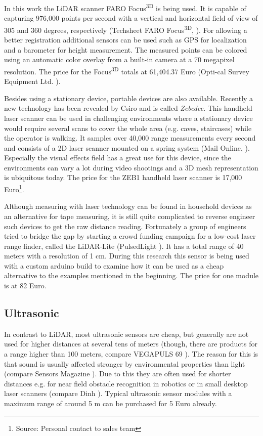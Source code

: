 In this work the LiDAR scanner FARO Focus\textsuperscript{3D} is being used. It is capable of capturing 976,000 points per second with a vertical and horizontal field of view of 305 and 360 degrees, respectively (Techsheet FARO Focus\textsuperscript{3D}, \parencite{faro_techsheet}). For allowing a better registration additional sensors can be used such as GPS for localization and a barometer for height measurement. The measured points can be colored using an automatic color overlay from a built-in camera at a 70 megapixel resolution. The price for the Focus\textsuperscript{3D} totals at 61,404.37 Euro (Opti-cal Survey Equipment Ltd. \parencite{survey_equipment}).

Besides using a stationary device, portable devices are also available. Recently a new technology has been revealed by Csiro and is called \textit{Zebedee}. This handheld laser scanner can be used in challenging environments where a stationary device would require several scans to cover the whole area (e.g. caves, staircases) while the operator is walking. It samples over 40,000 range measurements every second and consists of a 2D laser scanner mounted on a spring system (Mail Online, \parencite{zebedee_info}). Especially the visual effects field has a great use for this device, since the environments can vary a lot during video shootings and a 3D mesh representation is ubiquitous today. The price for the ZEB1 handheld laser scanner is 17,000 Euro\footnote{Source: Personal contact to sales team}.

Although measuring with laser technology can be found in household devices as an alternative for tape measuring, it is still quite complicated to reverse engineer such devices to get the raw distance reading. Fortunately a group of engineers tried to bridge the gap by starting a crowd funding campaign for a low-cost laser range finder, called the LiDAR-Lite (PulsedLight \parencite{pulsedlight}). It has a total range of 40 meters with a resolution of 1 cm. During this research this sensor is being used with a custom arduino build to examine how it can be used as a cheap alternative to the examples mentioned in the beginning. The price for one module is at 82 Euro.

\subsection{Ultrasonic}

In contrast to LiDAR, most ultrasonic sensors are cheap, but generally are not used for higher distances at several tens of meters (though, there are products for a range higher than 100 meters, compare VEGAPULS 69 \parencite{vegapuls}). The reason for this is that sound is usually affected stronger by environmental properties than light (compare Sensors Magazine \parencite{sensorsmag}). Due to this they are often used for shorter distances e.g. for near field obstacle recognition in robotics or in small desktop laser scanners (compare Dinh \parencite{yt_smalldesktoplaser}). Typical ultrasonic sensor modules with a maximum range of around 5 m can be purchased for 5 Euro already.



